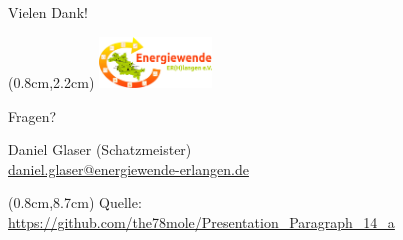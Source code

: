 \begin{frame}{Vielen Dank!}

   \begin{textblock*}{3cm}(0.8cm,2.2cm)  %
      \includegraphics[width=3cm]{images/Logo_EWERH_eV_small.png}
   \end{textblock*}
   \vspace{1.8cm}
   \begin{center}
      \Huge Fragen?
   \end{center}
   \vfill
   \begin{minipage}{0.20\textwidth}
      \centering
   \end{minipage}
   \hfill
   \begin{minipage}{0.75\textwidth}
      \begin{flushright}
         \footnotesize Daniel Glaser (Schatzmeister) \\
         \href{mailto:daniel.glaser@energiewende-erlangen.de}{daniel.glaser@energiewende-erlangen.de}
      \end{flushright}
   \end{minipage}%

   \begin{textblock*}{11cm}(0.8cm,8.7cm)
      \centering 
      \footnotesize Quelle: \url{https://github.com/the78mole/Presentation_Paragraph_14_a}
   \end{textblock*}
\end{frame}

\usebackgroundtemplate{}